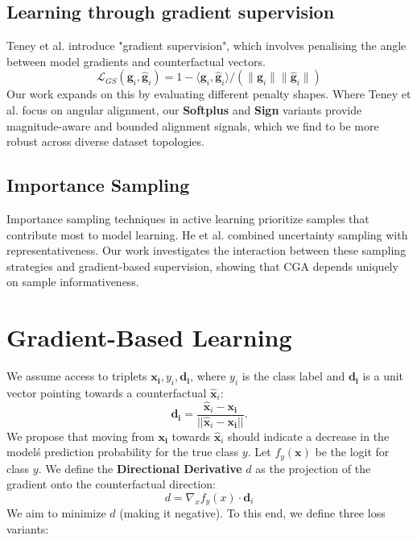 \documentclass[sigconf,anonymous]{aamas}
\begin{document}
\subsection{Learning through gradient supervision}
Teney et al. \cite{teney2020learning} introduce "gradient supervision", which involves penalising the angle between model gradients and counterfactual vectors. 
\begin{equation}
        \mathcal{L}_{GS} \left(\mathbf{g}_i,\hat{\mathbf{g}}_i \right)  = 
        1 - \langle\mathbf{g}_i,\hat{\mathbf{g}}_i \rangle /
        \left( \lVert \mathbf{g}_i \rVert \lVert \hat{\mathbf{g}}_i \rVert \right)
\end{equation}
Our work expands on this by evaluating different penalty shapes. Where Teney et al. focus on angular alignment, our \textbf{Softplus} and \textbf{Sign} variants provide magnitude-aware and bounded alignment signals, which we find to be more robust across diverse dataset topologies.

\subsection{Importance Sampling}
Importance sampling techniques in active learning prioritize samples that contribute most to model learning. He et al.\cite{he2014active} combined uncertainty sampling with representativeness. Our work investigates the interaction between these sampling strategies and gradient-based supervision, showing that CGA depends uniquely on sample informativeness.

\section{Gradient-Based Learning}
\label{sec:gradient_learning}
We assume access to triplets {$\mathbf{x_i}, y_i, \mathbf{d_i}$}, where $y_i$ is the class label and $\mathbf{d_i}$ is a unit vector pointing towards a counterfactual $\hat{\mathbf{x}}_i$:
\begin{equation}
    \mathbf{d_i}=\frac{\hat{\mathbf{x}}_i - \mathbf{x_i}}{|\!|\hat{\mathbf{x}}_i - \mathbf{x_i}||}. \label{eq:dir_unit}
\end{equation}
We propose that moving from $\mathbf{x_i}$ towards $\hat{\mathbf{x}}_i$ should indicate a decrease in the model\'s prediction probability for the true class $y$. Let $f_y(\mathbf{x})$ be the logit for class $y$. We define the \textbf{Directional Derivative} $d$ as the projection of the gradient onto the counterfactual direction:
\begin{equation}
    d = \nabla_x f_{y}(x) \cdot \mathbf{d}_{i}
\end{equation}
We aim to minimize $d$ (making it negative). To this end, we define three loss variants:
\end{document}
